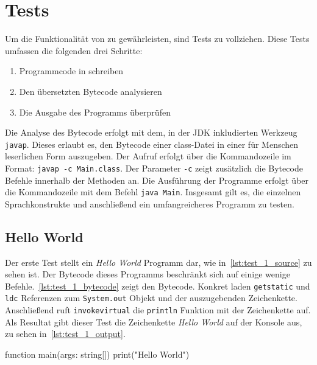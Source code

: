 \chapter{Tests}
\label{cha:tests}

Um die Funktionalität von \toya zu gewährleisten, sind Tests zu vollziehen. Diese Tests umfassen die folgenden drei Schritte:
\begin{enumerate}
    \item Programmcode in \toya schreiben
    \item Den übersetzten Bytecode analysieren
    \item Die Ausgabe des Programms überprüfen
\end{enumerate}

Die Analyse des Bytecode erfolgt mit dem, in der JDK inkludierten Werkzeug \texttt{javap}. Dieses erlaubt es, den Bytecode einer class-Datei in einer für Menschen leserlichen Form auszugeben. Der Aufruf erfolgt über die Kommandozeile im Format: \texttt{javap -c Main.class}. Der Parameter \texttt{-c} zeigt zusätzlich die Bytecode Befehle innerhalb der Methoden an. Die Ausführung der Programme erfolgt über die Kommandozeile mit dem Befehl \texttt{java Main}. Insgesamt gilt es, die einzelnen Sprachkonstrukte und anschließend ein umfangreicheres Programm zu testen.

\section{Hello World}

Der erste Test stellt ein \textit{Hello World} Programm dar, wie in~\autoref{lst:test_1_source} zu sehen ist. Der Bytecode dieses Programms beschränkt sich auf einige wenige Befehle.~\autoref{lst:test_1_bytecode} zeigt den Bytecode. Konkret laden \texttt{getstatic} und \texttt{ldc} Referenzen zum \texttt{System.out} Objekt und der auszugebenden Zeichenkette. Anschließend ruft \texttt{invokevirtual} die \texttt{println} Funktion mit der Zeichenkette auf. Als Resultat gibt dieser Test die Zeichenkette \textit{Hello World} auf der Konsole aus, zu sehen in~\autoref{lst:test_1_output}.

\begin{ToyaCode}[numbers=none, caption={Quelltext des Hello World Programms},label=lst:test_1_source]
function main(args: string[]) {
    print("Hello World")
}
\end{ToyaCode}


